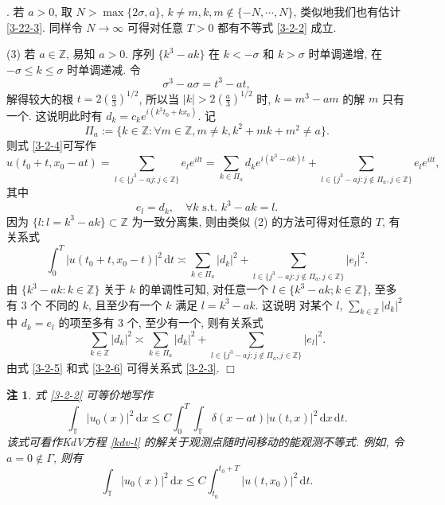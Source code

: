 \documentclass[master]{cugthesis}
\newcommand\Z{\ensuremath{\mathbb{Z}}}
\newcommand\T{\ensuremath{\mathbb{T}}}
\renewcommand\d{\ensuremath{\,\mathrm{d}}}
\newenvironment{proof}{{\noindent\itshape 证明}.}{\hfill $\Box$\par}
\newtheorem{remark}{注}
\begin{document}
\begin{proof}
    若 $a>0$, 取 $N>\max\lbrace 2\sigma, a\rbrace$, $k\neq m, k,m\notin \lbrace-N,\cdots, N\rbrace$, 类似地我们也有估计 \eqref{3-22-3}. 同样令 $N\to \infty$ 可得对任意 $T>0$ 都有不等式 \eqref{3-2-2} 成立. 
    
    (3) 若 $a\in \Z$, 易知 $a>0$. 序列 $\lbrace k^3-ak\rbrace$ 在 $k<-\sigma$ 和 $k>\sigma$ 时单调递增, 在 $-\sigma\le k\le \sigma$ 时单调递减. 令
    \begin{equation*}
        \sigma^3-a\sigma=t^3-at,
    \end{equation*}
    解得较大的根 $t=2\left(\frac{a}{3}\right)^{1 /2}$,
    所以当 $|k|> 2\left(\frac{a}{3}\right)^{1 /2}$ 时, $k=m^3-am$ 的解 $m$ 只有一个. 这说明此时有 $d_k=c_k e^{i(k^3t_0+kx_0)}$. 记
    \begin{equation*}
        \Pi_a:=\lbrace k\in \Z : \forall m\in \Z, m\neq k, k^2+mk+m^2\neq a \rbrace.
    \end{equation*}
    则式 \eqref{3-2-4}可写作
    \begin{equation*}
        u(t_0+t,x_0-at)=\sum_{l\in \lbrace j^3-aj:j\in \Z  \rbrace}e_l e^{ilt}=\sum_{k\in \Pi_a} d_k e^{i(k^3-ak)t}+\sum_{l\in \lbrace j^3-aj: j\notin \Pi_a, j\in \Z\rbrace} e_l e^{ilt},
    \end{equation*}  
    其中
    \begin{equation*}
        e_l=d_k, \quad \forall k \text{ s.t. } k^3-ak=l.
    \end{equation*}
    因为 $\lbrace l: l=k^3-ak \rbrace \subset \Z $ 为一致分离集, 则由类似 (2) 的方法可得对任意的 $T$, 有关系式
    \begin{equation}\label{3-2-5}
        \int_0^T|u(t_0+t,x_0-t)|^2\d t\asymp \sum_{k\in \Pi_a}|d_k|^2+\sum_{l\in \lbrace j^3-aj: j \notin \Pi_a,j\in\Z\rbrace }|e_l|^2.
    \end{equation}
    由 $\lbrace k^3-ak:k\in \Z\rbrace$ 关于 $k$ 的单调性可知, 对任意一个 $l\in \lbrace k^3-ak; k\in \Z\rbrace$, 至多有 3 个 不同的 $k$, 且至少有一个 $k$  满足 $l=k^3-ak$. 这说明 对某个 $l$, $\sum_{k\in\Z} |d_k|^2$ 中 $d_k=e_l$ 的项至多有 3 个, 至少有一个, 则有关系式
    \begin{equation}\label{3-2-6}
        \sum_{k\in \Z}|d_k|^2\asymp  \sum_{k\in \Pi_a}|d_k|^2+\sum_{l\in \lbrace j^3-aj: j \notin \Pi_a,j\in\Z\rbrace }|e_l|^2.
    \end{equation}
    由式 \eqref{3-2-5} 和式 \eqref{3-2-6} 可得关系式 \eqref{3-2-3}.
    \end{proof}
    
    \begin{remark}
    式 \eqref{3-2-2} 可等价地写作
    \begin{equation*}
        \int_{\T}|u_0(x)|^2\d x\le C\int_0^T\int_{\T}\delta(x-at)|u(t,x)|^2\d x\d t.
    \end{equation*}
    该式可看作KdV方程 \eqref{kdv-l} 的解关于观测点随时间移动的能观测不等式. 例如, 令 $a=0\notin \Gamma$, 则有
    \begin{equation*}
        \int_{\T}|u_0(x)|^2\d x\le C\int_{t_0}^{t_0+T} |u(t,x_0)|^2\d t.
    \end{equation*}
    \end{remark}
    
\end{document}
